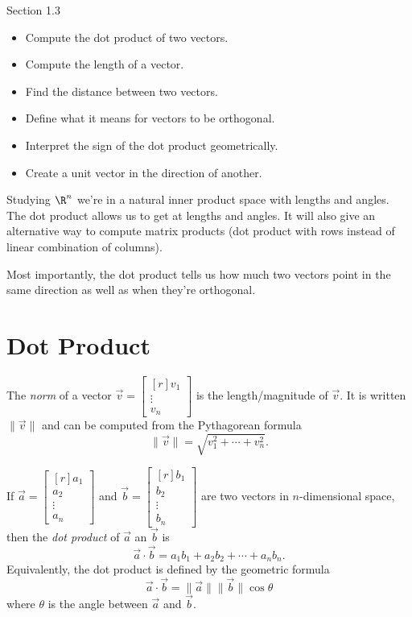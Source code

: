 \documentclass{problemset}
\newcommand{\mat}[1]{\begin{bmatrix*}[r]#1\end{bmatrix*}}
\begin{document}
\begin{lesson}
	\newpage

	Section 1.3

	\begin{itemize}
		\item Compute the dot product of two vectors.
		\item Compute the length of a vector.
		\item Find the distance between two vectors.
		\item Define what it means for vectors to be orthogonal.
		\item Interpret the sign of the dot product geometrically.
		\item Create a unit vector in the direction of another.
	\end{itemize}

	Studying $\R^n$ we're in a natural inner product space with lengths and
	angles. The dot product allows us to get at lengths and angles. It will
	also give an alternative way to compute matrix products (dot product with rows
	instead of linear combination of columns). 

	Most importantly, the dot product tells us how much two vectors point in
	the same direction as well as when they're orthogonal. 

	\newpage
\end{lesson}


\newpage
\section*{Dot Product}
	\begin{definition}[Norm]
		The \emph{norm} of a vector $\vec v=\mat{v_1\\\vdots\\v_n}$ is the
		length/magnitude of $\vec v$. It is written $\|\vec v\|$ and can be computed from
		the Pythagorean formula
		\[
			\|\vec v\|=\sqrt{v_1^2+\cdots +v_n^2}.
		\]
	\end{definition}

	\begin{definition}
		If $\vec a=\mat{a_1\\a_2\\ \vdots\\a_n}$ and 
		$\vec b=\mat{b_1\\b_2\\ \vdots\\b_n}$ are two vectors in $n$-dimensional 
		space, then the \emph{dot product} of $\vec a$ an $\vec b$ is
		\[
			\vec a\cdot\vec b = a_1b_1+a_2b_2+\cdots+a_nb_n.
		\]
		Equivalently, the dot product is defined by the geometric formula
		\[
			\vec a\cdot \vec b = \|\vec a\|\|\vec b\|\cos \theta
		\]
		where $\theta$ is the angle between $\vec a$ and $\vec b$.
	\end{definition}
	
\end{document}
